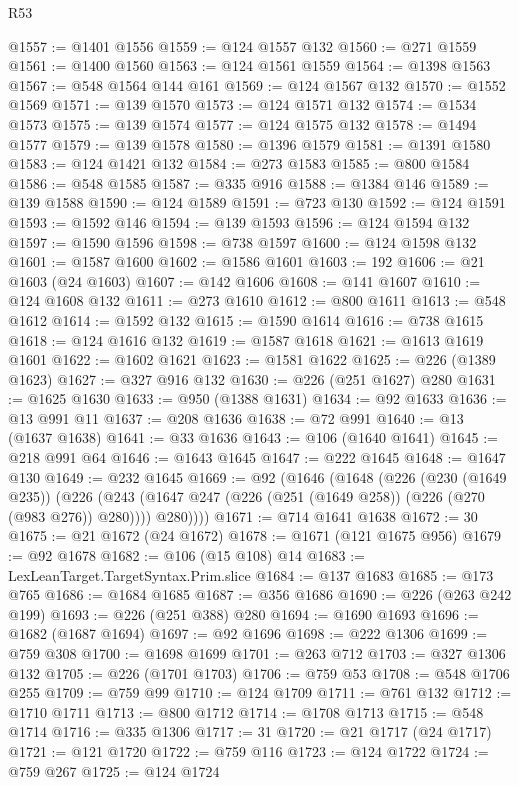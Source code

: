 \begin{lexlean}{R53}
\begin{coremodule}
@1557 := @1401 @1556
@1559 := @124 @1557 @132
@1560 := @271 @1559
@1561 := @1400 @1560
@1563 := @124 @1561 @1559
@1564 := @1398 @1563
@1567 := @548 @1564 @144 @161
@1569 := @124 @1567 @132
@1570 := @1552 @1569
@1571 := @139 @1570
@1573 := @124 @1571 @132
@1574 := @1534 @1573
@1575 := @139 @1574
@1577 := @124 @1575 @132
@1578 := @1494 @1577
@1579 := @139 @1578
@1580 := @1396 @1579
@1581 := @1391 @1580
@1583 := @124 @1421 @132
@1584 := @273 @1583
@1585 := @800 @1584
@1586 := @548 @1585
@1587 := @335 @916
@1588 := @1384 @146
@1589 := @139 @1588
@1590 := @124 @1589
@1591 := @723 @130
@1592 := @124 @1591
@1593 := @1592 @146
@1594 := @139 @1593
@1596 := @124 @1594 @132
@1597 := @1590 @1596
@1598 := @738 @1597
@1600 := @124 @1598 @132
@1601 := @1587 @1600
@1602 := @1586 @1601
@1603 := 192
@1606 := @21 @1603 (@24 @1603)
@1607 := @142 @1606
@1608 := @141 @1607
@1610 := @124 @1608 @132
@1611 := @273 @1610
@1612 := @800 @1611
@1613 := @548 @1612
@1614 := @1592 @132
@1615 := @1590 @1614
@1616 := @738 @1615
@1618 := @124 @1616 @132
@1619 := @1587 @1618
@1621 := @1613 @1619 @1601
@1622 := @1602 @1621
@1623 := @1581 @1622
@1625 := @226 (@1389 @1623)
@1627 := @327 @916 @132
@1630 := @226 (@251 @1627) @280
@1631 := @1625 @1630
@1633 := @950 (@1388 @1631)
@1634 := @92 @1633
@1636 := @13 @991 @11
@1637 := @208 @1636
@1638 := @72 @991
@1640 := @13 (@1637 @1638)
@1641 := @33 @1636
@1643 := @106 (@1640 @1641)
@1645 := @218 @991 @64
@1646 := @1643 @1645
@1647 := @222 @1645
@1648 := @1647 @130
@1649 := @232 @1645
@1669 := @92
    (@1646
      (@1648
        (@226
          (@230 (@1649 @235))
          (@226
            (@243 (@1647 @247 (@226 (@251 (@1649 @258)) (@226 (@270 (@983 @276)) @280))))
            @280))))
@1671 := @714 @1641 @1638
@1672 := 30
@1675 := @21 @1672 (@24 @1672)
@1678 := @1671 (@121 @1675 @956)
@1679 := @92 @1678
@1682 := @106 (@15 @108) @14
@1683 := LexLeanTarget.TargetSyntax.Prim.slice
@1684 := @137 @1683
@1685 := @173 @765
@1686 := @1684 @1685
@1687 := @356 @1686
@1690 := @226 (@263 @242 @199)
@1693 := @226 (@251 @388) @280
@1694 := @1690 @1693
@1696 := @1682 (@1687 @1694)
@1697 := @92 @1696
@1698 := @222 @1306
@1699 := @759 @308
@1700 := @1698 @1699
@1701 := @263 @712
@1703 := @327 @1306 @132
@1705 := @226 (@1701 @1703)
@1706 := @759 @53
@1708 := @548 @1706 @255
@1709 := @759 @99
@1710 := @124 @1709
@1711 := @761 @132
@1712 := @1710 @1711
@1713 := @800 @1712
@1714 := @1708 @1713
@1715 := @548 @1714
@1716 := @335 @1306
@1717 := 31
@1720 := @21 @1717 (@24 @1717)
@1721 := @121 @1720
@1722 := @759 @116
@1723 := @124 @1722
@1724 := @759 @267
@1725 := @124 @1724

\end{coremodule}
\end{lexlean}
